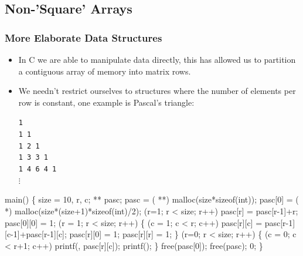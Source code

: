 \documentclass[smaller,handout,table]{beamer}
\begin{document}
\subsection{Non-'Square' Arrays}
\begin{frame}
\frametitle{More Elaborate Data Structures}
\begin{itemize}
\item In C we are able to manipulate data directly, this has allowed us to partition a contiguous array of memory into matrix rows.
\item We needn't restrict ourselves to structures where the number of elements per row is constant, one example is Pascal's triangle:\\
\begin{center}
\tt1\\\tt1 1\\\tt1  2  1\\\tt1  3  3  1\\\tt1  4  6  4  1\\$\vdots$
\end{center}
\end{itemize}
\end{frame}

\begin{frame}[fragile]
\begin{semiverbatim}
\scriptsize
\kr\kl{} main()
\kl\{
\kl   {} size = 10, r, c;
\kl   {} ** pasc;
\kl   pasc = ( **) malloc(size*sizeof(int));
\kl   pasc[0] = ( *) malloc(size*(size+1)*sizeof(int)/2);
\kl   {}
\kl   {} (r=1; r < size; r++) pasc[r] = pasc[r-1]+r;
\kl   pasc[0][0] = 1;
\kl   {} (r = 1; r < size; r++)
\kl   \{
\kl      {} (c = 1; c < r; c++)
\kl         pasc[r][c] = pasc[r-1][c-1]+pasc[r-1][c];
\kl      pasc[r][0] = 1; pasc[r][r] = 1;
\kl   \}
\kl   {} (r=0; r < size; r++)
\kl   \{
\kl      {} (c = 0; c < r+1; c++)
\kl         printf(, pasc[r][c]);
\kl      printf();
\kl   \}
\kl   free(pasc[0]);
\kl   free(pasc);
\kl   {} 0;
\kl\}
\end{semiverbatim}
\end{frame}
\end{document}
